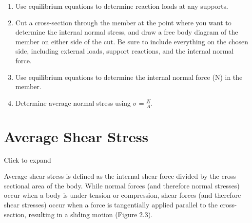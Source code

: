 \documentclass[
  letterpaper,
  DIV=11,
  numbers=noendperiod]{scrreprt}
\theoremstyle{definition}
\theoremstyle{remark}
\begin{document}
\begin{tcolorbox}[enhanced jigsaw, leftrule=.75mm, colbacktitle=quarto-callout-warning-color!10!white, breakable, opacityback=0, colback=white, titlerule=0mm, toprule=.15mm, colframe=quarto-callout-warning-color-frame, coltitle=black, title={Step-by-step: Average Normal Stress}, toptitle=1mm, bottomrule=.15mm, rightrule=.15mm, left=2mm, arc=.35mm, opacitybacktitle=0.6, bottomtitle=1mm]

\begin{enumerate}
\def\labelenumi{\arabic{enumi}.}
\item
  Use equilibrium equations to determine reaction loads at any supports.
\item
  Cut a cross-section through the member at the point where you want to
  determine the internal normal stress, and draw a free body diagram of
  the member on either side of the cut. Be sure to include everything on
  the chosen side, including external loads, support reactions, and the
  internal normal force.
\item
  Use equilibrium equations to determine the internal normal force (N)
  in the member.
\item
  Determine average normal stress using \(\sigma=\frac{N}{A}\).
\end{enumerate}

\end{tcolorbox}

\section{Average Shear Stress}\label{sec-2.2}

Click to expand

Average shear stress is defined as the internal shear force divided by
the cross-sectional area of the body. While normal forces (and therefore
normal stresses) occur when a body is under tension or compression,
shear forces (and therefore shear stresses) occur when a force is
tangentially applied parallel to the cross-section, resulting in a
sliding motion (Figure 2.3).
\end{document}
